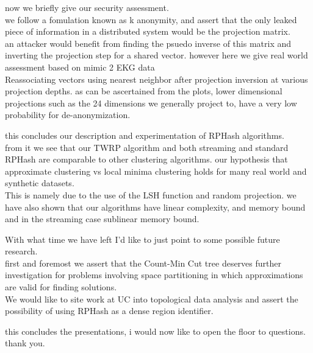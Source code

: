 \documentclass{beamer}
\begin{document}
\begin{frame}[plain]
now we briefly give our security assessment.\\
we follow a fomulation known as k anonymity, and assert that the only leaked piece
of information in a distributed system would be the projection matrix. \\
an attacker
would benefit from finding the psuedo inverse of this matrix and inverting the projection
step for a shared vector. however here we give real world assessment based on mimic 2
EKG data \\
Reassociating vectors using nearest neighbor after projection inversion
at various projection depths. as can be ascertained from the plots, lower dimensional
projections such as the 24 dimensions we generally project to, have a very low probability
for de-anonymization.
\end{frame}

\begin{frame}[plain]
this concludes our description and experimentation of RPHash algorithms.\\
from it we see that our TWRP algorithm and both streaming and standard RPHash are comparable
to other clustering algorithms. our hypothesis that approximate clustering vs local minima
clustering holds for many real world and synthetic datasets. \\
This is namely due to
the use of the LSH function and random projection. we have also shown that our algorithms
have linear complexity, and memory bound and in the streaming case sublinear memory bound.
\end{frame}

\begin{frame}[plain]
With what time we have left I'd like to just point to some possible future research.\\
first and foremost we assert that the Count-Min Cut tree deserves further investigation
for problems involving space partitioning in which approximations are valid for
finding solutions.\\
We would like to site work at UC into topological data analysis and assert the possibility
of using RPHash as a dense region identifier.
\end{frame}

\begin{frame}[plain]
this concludes the presentations, i would now like to open the floor to questions.
thank you.
\end{frame}
\end{document}
